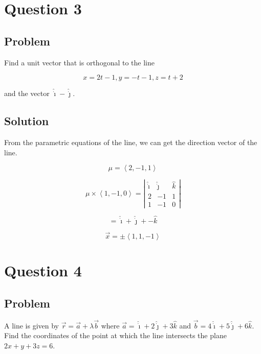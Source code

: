 \documentclass[12pt]{article}
\begin{document}
\section{Question 3}

\subsection{Problem}

Find a unit vector that is orthogonal to the line

\[
    x = 2t - 1, y = -t - 1, z = t + 2
\]

and the vector \(\hat{\dot{\imath}} - \hat{\dot{\jmath}}\).

\subsection{Solution}

From the parametric equations of the line, we can get the direction vector of the line.

\[
    \mu = \left\langle 2, -1, 1\right\rangle
\]

\[
    \mu \times \left\langle 1, -1, 0\right\rangle
    = \left\lvert
    \begin{array}{ccc}
        \hat{\dot{\imath}} & \hat{\dot{\jmath}} & \hat{k} \\
        2                  & -1                 & 1       \\
        1                  & -1                 & 0
    \end{array}
    \right\rvert
\]

\[
    = \hat{\dot{\imath}} + \hat{\dot{\jmath}} + -\hat{k}
\]

\[
    \vec{x} = \pm \left\langle 1, 1, -1\right\rangle
\]

\section{Question 4}

\subsection{Problem}

A line is given by \(\vec{r} = \vec{a} + \lambda \vec{b}\)
where \(\vec{a} = \hat{\dot{\imath}} + 2 \hat{\dot{\jmath}} + 3 \hat{k}\)
and \(\vec{b} = 4 \hat{\dot{\imath}} + 5 \hat{\dot{\jmath}} + 6 \hat{k}\).
Find the coordinates of the point at which the line intersects the plane \(2x + y + 3z = 6\).
\end{document}

